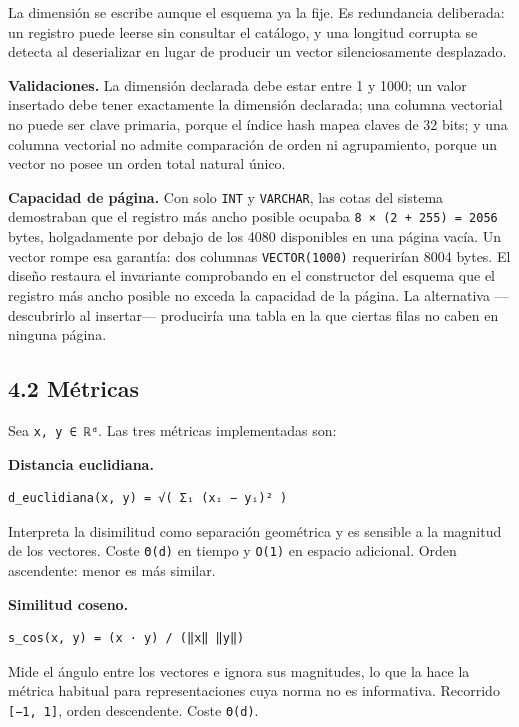\documentclass[11pt,a4paper]{article}
\let\pandocsubsection\subsection
\let\subsection\section
\let\subsubsection\pandocsubsection
\begin{document}
La dimensión se escribe aunque el esquema ya la fije. Es redundancia
deliberada: un registro puede leerse sin consultar el catálogo, y una
longitud corrupta se detecta al deserializar en lugar de producir un
vector silenciosamente desplazado.

\textbf{Validaciones.} La dimensión declarada debe estar entre 1 y 1000;
un valor insertado debe tener exactamente la dimensión declarada; una
columna vectorial no puede ser clave primaria, porque el índice hash
mapea claves de 32 bits; y una columna vectorial no admite comparación
de orden ni agrupamiento, porque un vector no posee un orden total
natural único.

\textbf{Capacidad de página.} Con solo \texttt{INT} y \texttt{VARCHAR},
las cotas del sistema demostraban que el registro más ancho posible
ocupaba \texttt{8\ ×\ (2\ +\ 255)\ =\ 2056} bytes, holgadamente por
debajo de los 4080 disponibles en una página vacía. Un vector rompe esa
garantía: dos columnas \texttt{VECTOR(1000)} requerirían 8004 bytes. El
diseño restaura el invariante comprobando en el constructor del esquema
que el registro más ancho posible no exceda la capacidad de la página.
La alternativa ---descubrirlo al insertar--- produciría una tabla en la
que ciertas filas no caben en ninguna página.

\subsubsection{4.2 Métricas}\label{42-muxe9tricas}

Sea \texttt{x,\ y\ ∈\ ℝᵈ}. Las tres métricas implementadas son:

\textbf{Distancia euclidiana.}

\begin{verbatim}
d_euclidiana(x, y) = √( Σᵢ (xᵢ − yᵢ)² )
\end{verbatim}

Interpreta la disimilitud como separación geométrica y es sensible a la
magnitud de los vectores. Coste \texttt{Θ(d)} en tiempo y \texttt{O(1)}
en espacio adicional. Orden ascendente: menor es más similar.

\textbf{Similitud coseno.}

\begin{verbatim}
s_cos(x, y) = (x · y) / (‖x‖ ‖y‖)
\end{verbatim}

Mide el ángulo entre los vectores e ignora sus magnitudes, lo que la
hace la métrica habitual para representaciones cuya norma no es
informativa. Recorrido \texttt{{[}−1,\ 1{]}}, orden descendente. Coste
\texttt{Θ(d)}.
\end{document}
